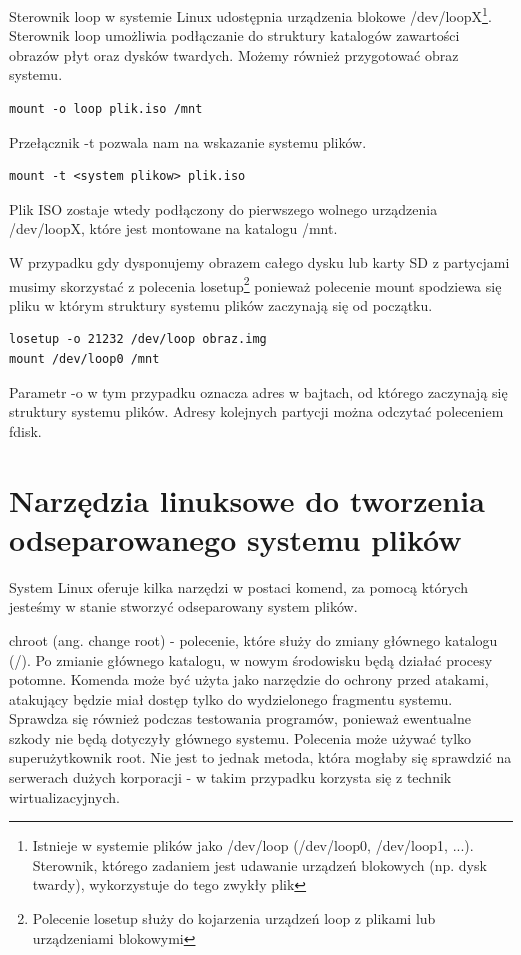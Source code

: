Sterownik loop w systemie Linux udostępnia urządzenia blokowe /dev/loopX\footnote{Istnieje w systemie plików jako /dev/loop (/dev/loop0, /dev/loop1, ...). Sterownik, którego zadaniem jest udawanie urządzeń blokowych (np. dysk twardy), wykorzystuje do tego zwykły plik}. Sterownik loop umożliwia podłączanie do struktury katalogów zawartości obrazów płyt oraz dysków twardych. Możemy również przygotować obraz systemu.

\begin{lstlisting}
mount -o loop plik.iso /mnt
\end{lstlisting}

Przełącznik -t pozwala nam na wskazanie systemu plików.

\begin{lstlisting}
mount -t <system plikow> plik.iso
\end{lstlisting}

Plik ISO zostaje wtedy podłączony do pierwszego wolnego urządzenia /dev/loopX, które jest montowane na katalogu /mnt. 

W przypadku gdy dysponujemy obrazem całego dysku lub karty SD z partycjami musimy skorzystać z polecenia losetup\footnote{Polecenie losetup służy do kojarzenia urządzeń loop z plikami lub urządzeniami blokowymi} ponieważ polecenie mount spodziewa się pliku w którym struktury systemu plików zaczynają się od początku.

\begin{lstlisting}
losetup -o 21232 /dev/loop obraz.img
mount /dev/loop0 /mnt
\end{lstlisting}

Parametr -o w tym przypadku oznacza adres w bajtach, od którego zaczynają się struktury systemu plików.
Adresy kolejnych partycji można odczytać poleceniem fdisk.

\newpage

\section{Narzędzia linuksowe do tworzenia odseparowanego systemu plików}

System Linux oferuje kilka narzędzi w postaci komend, za pomocą których jesteśmy w stanie stworzyć odseparowany system plików.

chroot (ang. change root) - polecenie, które służy do zmiany głównego katalogu (/). Po zmianie głównego katalogu, w nowym środowisku będą działać procesy potomne. Komenda może być użyta jako narzędzie do ochrony przed atakami, atakujący będzie miał dostęp tylko do wydzielonego fragmentu systemu. Sprawdza się również podczas testowania programów, ponieważ ewentualne szkody nie będą dotyczyły głównego systemu. Polecenia może używać tylko superużytkownik root. Nie jest to jednak metoda, która mogłaby się sprawdzić na serwerach dużych korporacji - w takim przypadku korzysta się z technik wirtualizacyjnych.  


